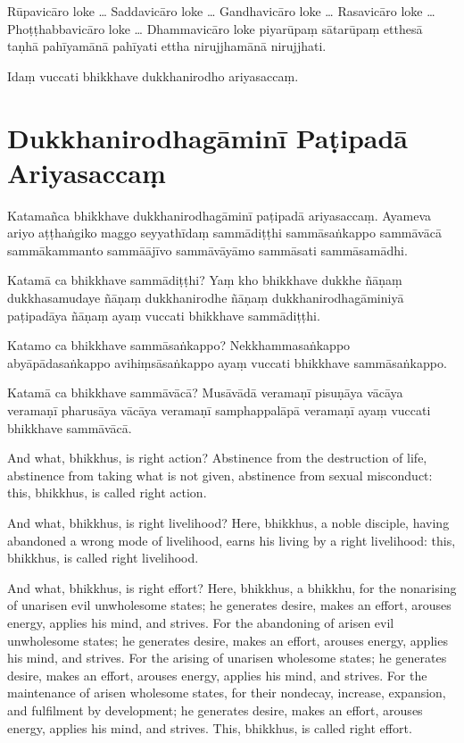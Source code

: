 Rūpavicāro loke \ldots{} Saddavicāro loke \ldots{} Gandhavicāro loke \ldots{}
Rasavicāro loke \ldots{} Phoṭṭhabbavicāro loke \ldots{} Dhammavicāro loke
piyarūpaṃ sātarūpaṃ etthesā taṇhā pahīyamānā pahīyati ettha nirujjhamānā
nirujjhati.

Idaṃ vuccati bhikkhave dukkhanirodho ariyasaccaṃ.

\section*{Dukkhanirodhagāminī Paṭipadā Ariyasaccaṃ}

Katamañca bhikkhave dukkhanirodhagāminī paṭipadā ariyasaccaṃ. Ayameva ariyo
aṭṭhaṅgiko maggo seyyathīdaṃ sammādiṭṭhi sammāsaṅkappo sammāvācā sammākammanto
sammāājīvo sammāvāyāmo sammāsati sammāsamādhi.

Katamā ca bhikkhave sammādiṭṭhi? Yaṃ kho bhikkhave dukkhe ñāṇaṃ dukkhasamudaye
ñāṇaṃ dukkhanirodhe ñāṇaṃ dukkhanirodhagāminiyā paṭipadāya ñāṇaṃ ayaṃ vuccati
bhikkhave sammādiṭṭhi.

Katamo ca bhikkhave sammāsaṅkappo? Nekkhammasaṅkappo abyāpādasaṅkappo
avihiṃsāsaṅkappo ayaṃ vuccati bhikkhave sammāsaṅkappo.

Katamā ca bhikkhave sammāvācā? Musāvādā veramaṇī pisuṇāya vācāya veramaṇī
pharusāya vācāya veramaṇī samphappalāpā veramaṇī ayaṃ vuccati bhikkhave
sammāvācā.

\englishPage

And what, bhikkhus, is right action? Abstinence from the destruction of life,
abstinence from taking what is not given, abstinence from sexual misconduct:
this, bhikkhus, is called right action.

And what, bhikkhus, is right livelihood? Here, bhikkhus, a noble disciple,
having abandoned a wrong mode of livelihood, earns his living by a right
livelihood: this, bhikkhus, is called right livelihood.

And what, bhikkhus, is right effort? Here, bhikkhus, a bhikkhu, for the
nonarising of unarisen evil unwholesome states; he generates desire, makes an
effort, arouses energy, applies his mind, and strives. For the abandoning of
arisen evil unwholesome states; he generates desire, makes an effort, arouses
energy, applies his mind, and strives. For the arising of unarisen wholesome
states; he generates desire, makes an effort, arouses energy, applies his mind,
and strives. For the maintenance of arisen wholesome states, for their nondecay,
increase, expansion, and fulfilment by development; he generates desire, makes
an effort, arouses energy, applies his mind, and strives. This, bhikkhus, is
called right effort.

